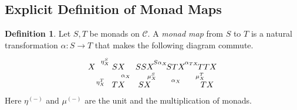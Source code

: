 \documentclass[9pt, preprint]{sigplanconf}
\theoremstyle{theorem}
\theoremstyle{definition}
\newtheorem{definition}[theorem]{Definition}
\newcommand{\cat}[1]{\mathcal{#1}}
\newcommand{\place}{{-}}
\begin{document}
\subsection{Explicit Definition of Monad Maps}
\label{appendix:monadMap}
\begin{definition}
 Let $S,T$ be monads on $\cat{C}$. A
 \emph{monad map} from $S$ to $T$ is
 a natural transformation $\alpha\colon S\to T$ that makes the following
 diagram commute.
 \begin{equation}
     \xymatrix@R-1.5em@C-1em{
        X \ar[r]^{\eta^S_X} \ar[rd]_{\eta^T_X}
        & SX \ar[d]^{\alpha_X} \\
        & TX
     }
     \xymatrix@R-1.5em@C-1.5em{
        SSX \ar[r]^{S \alpha_{X}} \ar[d]^{\mu^S_X}
        & STX \ar[r]^{\alpha_{TX}}
        & TTX \ar[d]_{\mu^T_X} \\
        SX \ar[rr]^{\alpha_{X}}
        && TX
   }
 \end{equation}
 Here $\eta^{(\place)}$ and $\mu^{(\place)}$ are the unit and the multiplication of monads.
\end{definition}
\end{document}
